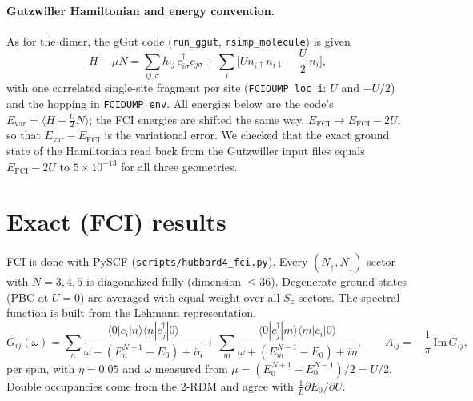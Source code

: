 \documentclass[11pt]{article}
\newcommand{\dg}{^{\dagger}}
\newcommand{\Evar}{E_{\mathrm{var}}}
\newcommand{\EFCI}{E_{\mathrm{FCI}}}
\begin{document}
\paragraph{Gutzwiller Hamiltonian and energy convention.}
As for the dimer, the gGut code (\texttt{run\_ggut}, \texttt{rsimp\_molecule}) is given
\begin{equation}
  H-\mu N = \sum_{ij,\sigma} h_{ij}\, c\dg_{i\sigma} c_{j\sigma}
            + \sum_i\Big[U n_{i\uparrow} n_{i\downarrow}-\frac{U}{2}\,n_i\Big],
\end{equation}
with one correlated single-site fragment per site (\texttt{FCIDUMP\_loc\_i}: $U$ and $-U/2$) and the
hopping in \texttt{FCIDUMP\_env}. All energies below are the code's
$\Evar=\langle H-\frac{U}{2}N\rangle$; the FCI energies are shifted the same way,
$\EFCI\to\EFCI-2U$, so that $\Evar-\EFCI$ is the variational error. We checked that the
exact ground state of the Hamiltonian read back from the Gutzwiller input files equals
$\EFCI-2U$ to $5\times10^{-13}$ for all three geometries.

\section{Exact (FCI) results}
\label{sec:fci}

FCI is done with PySCF (\texttt{scripts/hubbard4\_fci.py}). Every $(N_\uparrow,N_\downarrow)$ sector with
$N=3,4,5$ is diagonalized fully (dimension $\le36$). Degenerate ground states (PBC at $U=0$) are
averaged with equal weight over all $S_z$ sectors. The spectral function is built from the Lehmann
representation,
\begin{equation}
  G_{ij}(\omega)=\sum_n\frac{\langle0|c_i|n\rangle\langle n|c\dg_j|0\rangle}{\omega-(E^{N+1}_n-E_0)+i\eta}
  +\sum_m\frac{\langle0|c\dg_j|m\rangle\langle m|c_i|0\rangle}{\omega+(E^{N-1}_m-E_0)+i\eta},
  \qquad A_{ij}=-\frac1\pi\,\mathrm{Im}\,G_{ij},
\end{equation}
per spin, with $\eta=0.05$ and $\omega$ measured from $\mu=(E_0^{N+1}-E_0^{N-1})/2=U/2$.
Double occupancies come from the 2-RDM and agree with $\frac1L\partial E_0/\partial U$.
\end{document}
